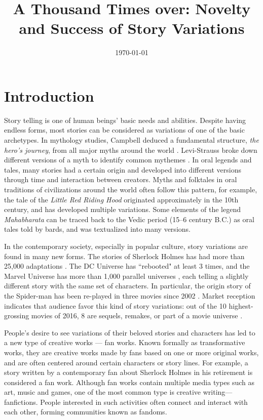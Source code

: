 \documentclass[a4paper]{article}
\begin{document}

\title{A Thousand Times over: Novelty and Success of Story Variations} %
\date{\today}
\maketitle %

\section{Introduction} %
\label{sec:introduction}

Story telling is one of human beings' basic needs and abilities\cite{gottschall2012storytelling}. Despite having endless forms, most stories can be considered as variations of one of the basic archetypes. In mythology studies, Campbell deduced a fundamental structure, \emph{the hero's journey}, from all major myths around the world \cite{campbell2008hero}. Levi-Strauss broke down different versions of a myth to identify common mythemes \cite{levi1955structural}. In oral legends and tales, many stories had a certain origin and developed into different versions through time and interaction between creators. Myths and folktales in oral traditions of civilizations around the world often follow this pattern, for example, the tale of the \emph{Little Red Riding Hood} originated approximately in the 10th century, and has developed multiple variations\cite{littlered}. Some elements of the legend \emph{Mahabharata} can be traced back to the Vedic period (15--6 century B.C.) as oral tales told by bards, and was textualized into many versions\cite{van2011mahabharata}.

In the contemporary society, especially in popular culture, story variations are found in many new forms. The stories of Sherlock Holmes has had more than 25,000 adaptations \cite{doyle2007new}. The DC Universe has ``rebooted" at least 3 times, and the Marvel Universe has more than 1,000 parallel universes \cite{marvelmultiverse}, each telling a slightly different story with the same set of characters. In particular, the origin story of the Spider-man has been re-played in three movies since 2002 \cite{spiderman}. Market reception indicates that audience favor this kind of story variations: out of the 10 highest-grossing movies of 2016, 8 are sequels, remakes, or part of a movie universe \cite{2016film}.

People's desire to see variations of their beloved stories and characters has led to a new type of creative works --- fan works. Known formally as transformative works, they are creative works made by fans based on one or more original works, and are often centered around certain characters or story lines\cite{wiki:transf_work}. For example, a story written by a contemporary fan about Sherlock Holmes in his retirement is considered a fan work. Although fan works contain multiple media types such as art, music and games, one of the most common type is creative writing---fanfictions. People interested in such activities often connect and interact with each other, forming communities known as fandoms\cite{wiki:fandom}.
\end{document}
